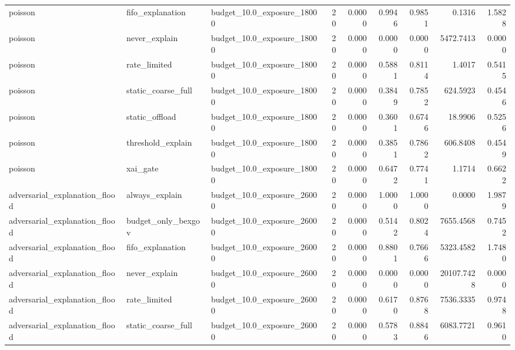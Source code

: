 \begin{table}[t]
\begin{tabular}{lllrrrrrr}
poisson & fifo\_explanation & budget\_10.0\_exposure\_18000 & 20 & 0.0000 & 0.9946 & 0.9851 & 0.1316 & 1.5828 \\
poisson & never\_explain & budget\_10.0\_exposure\_18000 & 20 & 0.0000 & 0.0000 & 0.0000 & 5472.7413 & 0.0000 \\
poisson & rate\_limited & budget\_10.0\_exposure\_18000 & 20 & 0.0000 & 0.5881 & 0.8114 & 1.4017 & 0.5415 \\
poisson & static\_coarse\_full & budget\_10.0\_exposure\_18000 & 20 & 0.0000 & 0.3849 & 0.7852 & 624.5923 & 0.4546 \\
poisson & static\_offload & budget\_10.0\_exposure\_18000 & 20 & 0.0000 & 0.3601 & 0.6746 & 18.9906 & 0.5256 \\
poisson & threshold\_explain & budget\_10.0\_exposure\_18000 & 20 & 0.0000 & 0.3851 & 0.7862 & 606.8408 & 0.4549 \\
poisson & xai\_gate & budget\_10.0\_exposure\_18000 & 20 & 0.0000 & 0.6472 & 0.7741 & 1.1714 & 0.6622 \\
adversarial\_explanation\_flood & always\_explain & budget\_10.0\_exposure\_26000 & 20 & 0.0000 & 1.0000 & 1.0000 & 0.0000 & 1.9879 \\
adversarial\_explanation\_flood & budget\_only\_bexgov & budget\_10.0\_exposure\_26000 & 20 & 0.0000 & 0.5142 & 0.8024 & 7655.4568 & 0.7452 \\
adversarial\_explanation\_flood & fifo\_explanation & budget\_10.0\_exposure\_26000 & 20 & 0.0000 & 0.8801 & 0.7666 & 5323.4582 & 1.7480 \\
adversarial\_explanation\_flood & never\_explain & budget\_10.0\_exposure\_26000 & 20 & 0.0000 & 0.0000 & 0.0000 & 20107.7428 & 0.0000 \\
adversarial\_explanation\_flood & rate\_limited & budget\_10.0\_exposure\_26000 & 20 & 0.0000 & 0.6170 & 0.8768 & 7536.3335 & 0.9748 \\
adversarial\_explanation\_flood & static\_coarse\_full & budget\_10.0\_exposure\_26000 & 20 & 0.0000 & 0.5783 & 0.8846 & 6083.7721 & 0.9610 \\
\bottomrule
\end{tabular}
\end{table}
